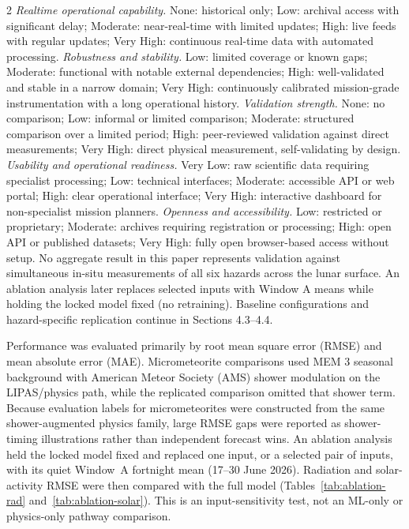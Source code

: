 \begin{multicols}{2}
\textit{Realtime operational capability.} None: historical only; Low: archival access with significant delay; Moderate: near-real-time with limited updates; High: live feeds with regular updates; Very High: continuous real-time data with automated processing. 
\textit{Robustness and stability.} Low: limited coverage or known gaps; Moderate: functional with notable external dependencies; High: well-validated and stable in a narrow domain; Very High: continuously calibrated mission-grade instrumentation with a long operational history. 
\textit{Validation strength.} None: no comparison; Low: informal or limited comparison; Moderate: structured comparison over a limited period; High: peer-reviewed validation against direct measurements; Very High: direct physical measurement, self-validating by design. 
\textit{Usability and operational readiness.} Very Low: raw scientific data requiring specialist processing; Low: technical interfaces; Moderate: accessible API or web portal; High: clear operational interface; Very High: interactive dashboard for non-specialist mission planners. 
\textit{Openness and accessibility.} Low: restricted or proprietary; Moderate: archives requiring registration or processing; High: open API or published datasets; Very High: fully open browser-based access without setup. No aggregate result in this paper represents validation against simultaneous in-situ measurements of all six hazards across the lunar surface. An ablation analysis later replaces selected inputs with Window A means while holding the locked model fixed (no retraining). Baseline configurations and hazard-specific replication continue in Sections 4.3--4.4.

Performance was evaluated primarily by root mean square error (RMSE) and mean absolute error (MAE). Micrometeorite comparisons used MEM 3 seasonal background with American Meteor Society (AMS) shower modulation on the LIPAS/physics path, while the replicated comparison omitted that shower term. Because evaluation labels for micrometeorites were constructed from the same shower-augmented physics family, large RMSE gaps were reported as shower-timing illustrations rather than independent forecast wins. An ablation analysis held the locked model fixed and replaced one input, or a selected pair of inputs, with its quiet Window~A fortnight mean (17--30 June 2026). Radiation and solar-activity RMSE were then compared with the full model (Tables~\ref{tab:ablation-rad} and~\ref{tab:ablation-solar}). This is an input-sensitivity test, not an ML-only or physics-only pathway comparison.


\end{multicols}
